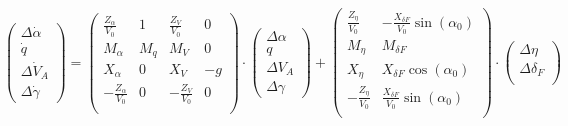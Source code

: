 \begin{equation}\label{eq:laengsbewegung}
	\begin{pmatrix}
		\Delta \dot \alpha\\
		\dot q\\
		\Delta \dot V_A\\
		\Delta \dot \gamma
	\end{pmatrix} = 
	\begin{pmatrix}
		\frac{Z_\alpha}{V_0} & 1 & \frac{Z_V}{V_0} & 0\\
		M_\alpha & M_q & M_V & 0\\
		X_\alpha & 0 & X_V & -g\\
		-\frac{Z_\alpha}{V_0} & 0 & -\frac{Z_V}{V_0} & 0\\
	\end{pmatrix} \cdot
	\begin{pmatrix}
		\Delta \alpha\\
		q\\
		\Delta V_A\\
		\Delta \gamma
	\end{pmatrix} + 
	\begin{pmatrix}
		\frac{Z_\eta}{V_0} & -\frac{X_{\delta F}}{V_0} \sin{(\alpha_0)}\\
		M_\eta & M_{\delta F}\\
		X_\eta & X_{\delta F} \cos{(\alpha_0)}\\
		-\frac{Z_\eta}{V_0} & \frac{X_{\delta F}}{V_0} \sin{(\alpha_0)}\\
	\end{pmatrix}\cdot
	\begin{pmatrix}
		\Delta \eta\\
		\Delta \delta_F\\
	\end{pmatrix}
\end{equation}

